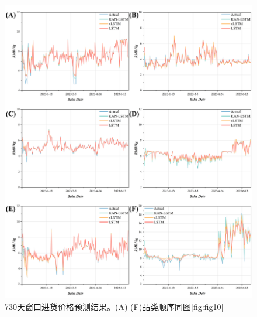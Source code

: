 \documentclass[lang=cn,12pt,a4paper]{elegantpaper}
\begin{document}
\begin{figure}[H]
    \centering
    \includegraphics[width=1\textwidth]{图片11.png}
    \caption{730天窗口进货价格预测结果。(A)-(F)品类顺序同图\ref{fig:fig10}}
    \label{fig:fig11}
\end{figure}
\end{document}
